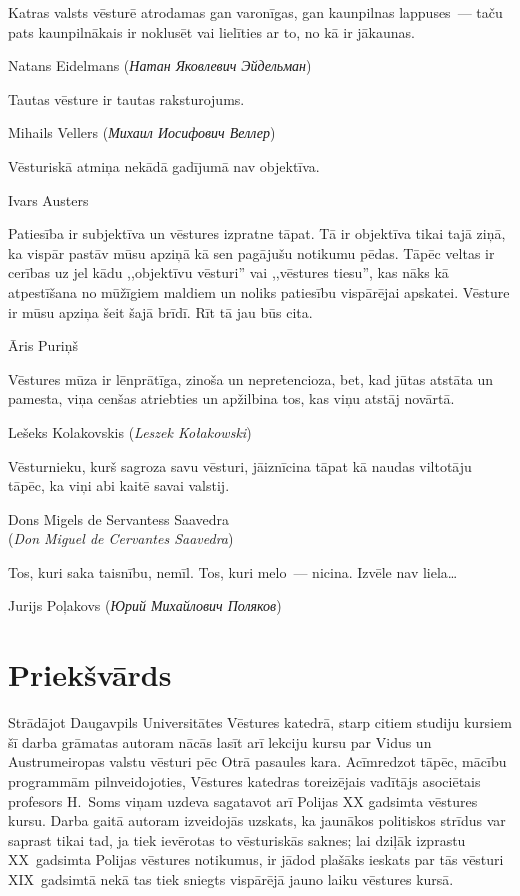 \documentclass[twoside,a5paper,12pt,fleqn,openany]{extbook}
\newcommand{\pltxti}[1]{\textit{\textpolish{#1}}}
\newcommand{\rutxti}[1]{\textit{\textrussian{#1}}}
\newcommand{\estxti}[1]{\textit{\textspanish{#1}}}
\begin{document}
\epigraph
{Katras valsts vēsturē atrodamas gan varonīgas, gan kaunpilnas lappuses~--- taču pats kaunpilnākais ir noklusēt vai lielīties ar to, no kā ir jākaunas.}
{Natans Eidelmans (\rutxti{Натан Яковлевич Эйдельман})}

\epigraph
{Tautas vēsture ir tautas raksturojums.}
{Mihails Vellers (\rutxti{Михаил Иосифович Веллер})}

\epigraph
{Vēsturiskā atmiņa nekādā gadījumā nav objektīva.}
{Ivars Austers}

\newpage

\epigraph
{Patiesība ir subjektīva un vēstures izpratne tāpat.
Tā ir objektīva tikai tajā ziņā, ka vispār pastāv mūsu apziņā kā sen pagājušu notikumu pēdas.
Tāpēc veltas ir cerības uz jel kādu ,,objektīvu vēsturi” vai ,,vēstures tiesu”, kas nāks kā atpestīšana no mūžīgiem maldiem un noliks patiesību vispārējai apskatei.
Vēsture ir mūsu apziņa šeit šajā brīdī.
Rīt tā jau būs cita.}
{Āris Puriņš}

\epigraph
{Vēstures mūza ir lēnprātīga, zinoša un nepretencioza, bet, kad jūtas atstāta un pamesta, viņa cenšas atriebties un apžilbina tos, kas viņu atstāj novārtā.}
{Lešeks Kolakovskis (\pltxti{Leszek Kołakowski})}

\epigraph
{Vēsturnieku, kurš sagroza savu vēsturi, jāiznīcina tāpat kā naudas viltotāju tāpēc, ka viņi abi kaitē savai valstij.}
{Dons Migels de Servantess Saavedra\\(\estxti{Don Miguel de Cervantes Saavedra})}

\epigraph
{Tos, kuri saka taisnību, nemīl.
Tos, kuri melo~--- nicina.
Izvēle nav liela\ldots{}}
{Jurijs Poļakovs (\rutxti{Юрий Михайлович Поляков})}

\tableofcontents

\chapter*{Priekšvārds}

Strādājot Daugavpils Universitātes Vēstures katedrā, starp citiem studiju kursiem šī darba grāmatas autoram nācās lasīt arī lekciju kursu par Vidus un Austrumeiropas valstu vēsturi pēc Otrā pasaules kara.
Acīmredzot tāpēc, mācību programmām pilnveidojoties, Vēstures katedras toreizējais vadītājs asociētais profesors H.~Soms viņam uzdeva sagatavot arī Polijas XX gadsimta vēstures kursu.
Darba gaitā autoram izveidojās uzskats, ka jaunākos politiskos strīdus var saprast tikai tad, ja tiek ievērotas to vēsturiskās saknes; lai dziļāk izprastu XX~gadsimta Polijas vēstures notikumus, ir jādod plašāks ieskats par tās vēsturi XIX~gadsimtā nekā tas tiek sniegts vispārējā jauno laiku vēstures kursā.
\end{document}
